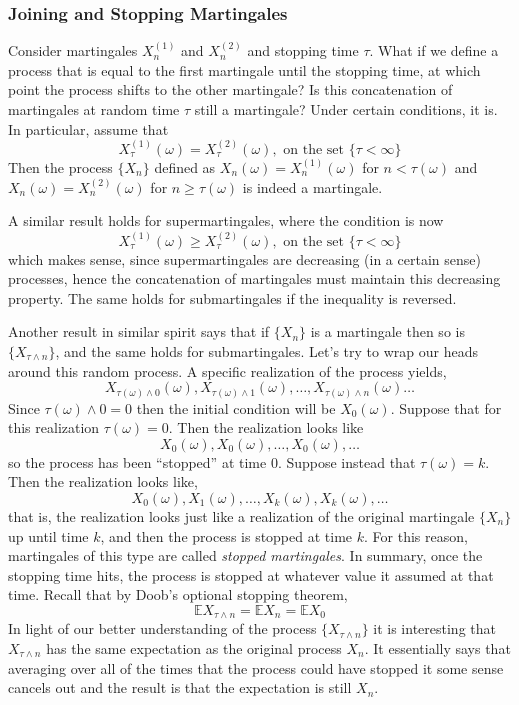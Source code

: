 \documentclass[12pt]{article}
\newcommand{\E}{\mathbb{E}}
\begin{document}
\subsubsection{Joining and Stopping Martingales}
Consider martingales $X_n^{(1)}$ and $X_n^{(2)}$ and stopping time $\tau$. What if we define a process that is equal to the first martingale until the stopping time, at which 
point the process shifts to the other martingale? Is this concatenation of martingales at random time $\tau$ still a martingale? Under certain conditions, it is. 
In particular, assume that 
\[X_\tau^{(1)}(\omega) = X_\tau^{(2)}(\omega), \text{ on the set } \{\tau < \infty\}\]
Then the process $\{X_n\}$ defined as $X_n(\omega) = X_n^{(1)}(\omega)$ for $n < \tau(\omega)$ and $X_n(\omega) = X_n^{(2)}(\omega)$ for 
$n \geq \tau(\omega)$ is indeed a martingale. 

A similar result holds for supermartingales, where the condition is now 
\[X_\tau^{(1)}(\omega) \geq X_\tau^{(2)}(\omega), \text{ on the set } \{\tau < \infty\}\]
which makes sense, since supermartingales are decreasing (in a certain sense) processes, hence the concatenation of martingales must maintain this decreasing property. 
The same holds for submartingales if the inequality is reversed. 

Another result in similar spirit says that if $\{X_n\}$ is a martingale then so is $\{X_{\tau \wedge n}\}$, and the same holds for submartingales. Let's try to wrap our heads 
around this random process. A specific realization of the process yields,
\[X_{\tau(\omega) \wedge 0}(\omega), X_{\tau(\omega) \wedge 1}(\omega), \dots, X_{\tau(\omega) \wedge n}(\omega) \dots\]
Since $\tau(\omega) \wedge 0 = 0$ then the initial condition will be $X_{0}(\omega)$. Suppose that for this realization $\tau(\omega) = 0$. Then the realization looks like
\[X_{0}(\omega), X_{0}(\omega), \dots, X_{0}(\omega), \dots\]
so the process has been ``stopped'' at time $0$. Suppose instead that $\tau(\omega) = k$. Then the realization looks like, 
\[X_{0}(\omega), X_{1}(\omega), \dots, X_{k}(\omega), X_{k}(\omega), \dots\]
that is, the realization looks just like a realization of the original martingale $\{X_n\}$ up until time $k$, and then the process is stopped at time $k$.  
For this reason, martingales of this type are called \textit{stopped martingales}. In summary, once the stopping time hits, the process is stopped at whatever value 
it assumed at that time. Recall that by Doob's optional stopping theorem, 
\[\E X_{\tau \wedge n} = \E X_n = \E X_0\]
In light of our better understanding of the process $\{X_{\tau \wedge n}\}$ it is interesting that $X_{\tau \wedge n}$ has the same expectation as the original process 
$X_n$. It essentially says that averaging over all of the times that the process could have stopped it some sense cancels out and the result is that the expectation 
is still $X_n$. 
\end{document}
